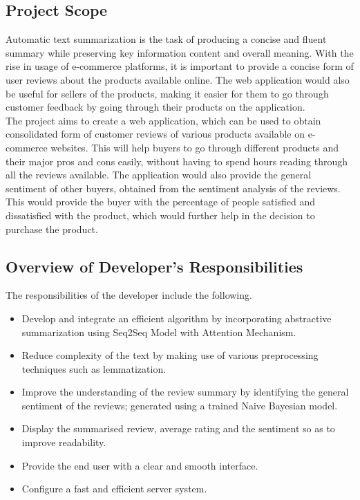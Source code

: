 \documentclass[11pt]{report}
\begin{document}
 \subsection{Project Scope}
 Automatic text summarization is the task of producing a concise and fluent summary while preserving key information content and overall meaning. With the rise in usage of e-commerce platforms, it is important to provide a concise form of user reviews about the products available online. The web application would also be useful for sellers of the products, making it easier for them to go through customer feedback by going through their products on the application.\\
 The project aims to create a web application, which can be used to obtain consolidated form of customer reviews of various products available on e-commerce websites. This will help buyers to go through different products and their major pros and cons easily, without having to spend hours reading through all the reviews available. The application would also provide the general sentiment of other buyers,  obtained from the sentiment analysis of the reviews. This would provide the buyer with the percentage of people satisfied and dissatisfied with the product, which would further help in the decision to purchase the product. \\ 
 
 \subsection{Overview of Developer’s Responsibilities}
The responsibilities of the developer include the following.
\begin{itemize}
    \item Develop and integrate an efficient algorithm by incorporating abstractive summarization using Seq2Seq Model with Attention Mechanism.
    \item Reduce complexity of the text by making use of various preprocessing techniques such as lemmatization.
    \item Improve the understanding of the review summary by identifying the general sentiment of the reviews; generated using a trained Naive Bayesian model.
    \item Display the summarised review, average rating and the sentiment so as to improve readability.
    \item Provide the end user with a clear and smooth interface.
    \item Configure a fast and efficient server system.
\end{itemize}
\end{document}

